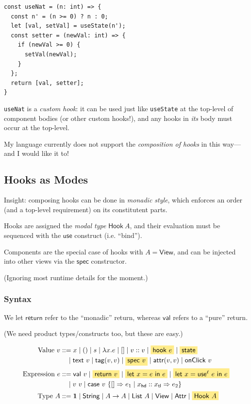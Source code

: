 \documentclass{article}
\newcommand{\mf}[1]{\mathsf{#1}}
\newcommand{\mb}[1]{\mathbf{#1}}
\newcommand{\mhl}[1]{\colorbox{LightGoldenrod1}{$#1$}}
\newcommand{\ptp}{A}
\newcommand{\tone}{\mb{1}}
\newcommand{\tstr}{\mf{String}}
\newcommand{\tview}{\mf{View}}
\newcommand{\tattr}{\mf{Attr}}
\newcommand{\vtxt}[1]{\mf{text}\ #1}
\newcommand{\vtag}[2]{\mf{tag}(#1, #2)}
\newcommand{\vattr}[2]{\mf{attr}(#1, #2)}
\newcommand{\vclick}[1]{\mf{onClick}\ #1}
\newcommand{\elet}[3]{\mf{let}\ #1 = #2\ \mf{in}\ #3}
\newcommand{\eret}[1]{\mf{return}\ #1}
\newcommand{\ecase}[5]{\mf{case}\ #1\ \{#2 \Rightarrow #3 \mid #4 \Rightarrow #5\}}
\begin{document}
\begin{lstlisting}
const useNat = (n: int) => {
  const n' = (n >= 0) ? n : 0;
  let [val, setVal] = useState(n');
  const setter = (newVal: int) => {
    if (newVal >= 0) {
      setVal(newVal);
    }
  };
  return [val, setter];
}
\end{lstlisting}

\texttt{useNat} is a \emph{custom hook}:
it can be used just like \texttt{useState}
at the top-level of component bodies
(or other custom hooks!),
and any hooks in \emph{its} body
must occur at the top-level.

My language currently does not support
the \emph{composition of hooks} in this way—
and I would like it to!

\subsection{Hooks as Modes}

Insight: composing hooks can be done in \emph{monadic style},
which enforces an order (and a top-level requirement)
on its constitutent parts.

Hooks are assigned the \emph{modal type} $\mf{Hook}\ A$,
and their evaluation must be sequenced with the $\mf{use}$ construct 
(i.e. ``bind'').

Components are the special case of hooks with $A=\mf{View}$,
and can be injected into other views via the $\mf{spec}$ constructor.

(Ignoring most runtime details for the moment.)

\subsubsection{Syntax}

We let $\mf{return}$ refer to the ``monadic'' return,
whereas $\mf{val}$ refers to a ``pure'' return.

(We need product types/constructs too, but these are easy.)

\begin{align*}
\text{Value } v &::= x \mid () \mid s 
\mid \lambda x.e \mid [] \mid v :: v
\mid \mhl{\mf{hook}\ e} \mid \mhl{\mf{state}}\\
&\quad\mid \vtxt{v} \mid \vtag{v}{v} \mid \mhl{\mf{spec}\ v}
\mid \vattr{v}{v} \mid \vclick{v}\\
\text{Expression } e &::= \mf{val}\ v \mid \mhl{\eret{v}} \mid \mhl{\elet{x}{e}{e}} 
\mid \mhl{\elet{x}{\mf{use}^\ell\ e}{e}}\\
&\quad\mid v\ v \mid
\ecase{v}{[]}{e_1}{x_\mf{hd} :: x_\mf{tl}}{e_2}\\
\text{Type } \ptp &::= \tone \mid \tstr \mid \ptp \rightarrow \ptp
\mid \mf{List}\ A \mid \tview \mid \tattr \mid \mhl{\mf{Hook}\ A}
\end{align*}
\end{document}
